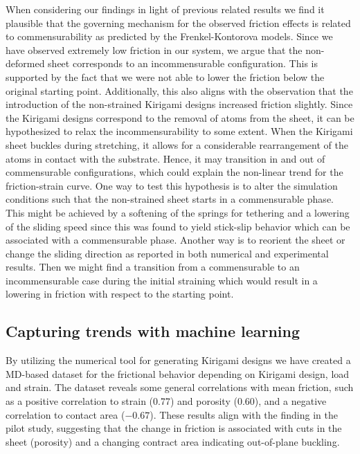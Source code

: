 When considering our findings in light of previous related results we find it
plausible that the governing mechanism for the observed friction effects is
related to commensurability as predicted by the Frenkel-Kontorova models. Since we have observed extremely low friction in
our system, we argue that the non-deformed sheet corresponds to an
incommensurable configuration. This is supported by the fact that we were not
able to lower the friction below the original starting point. Additionally, this
also aligns with the observation that the introduction of the non-strained
Kirigami designs increased friction slightly. Since the Kirigami designs correspond to the removal of atoms from the sheet, it can be hypothesized to relax the incommensurability to some extent. When the Kirigami sheet buckles during stretching, it allows for a
considerable rearrangement of the atoms in contact with the substrate. Hence, it
may transition in and out of commensurable configurations, which could explain
the non-linear trend for the friction-strain curve. One way to test this hypothesis is to alter the simulation conditions such that the non-strained sheet starts in a commensurable phase. This might be achieved by a softening of the springs for tethering and a lowering of the sliding speed since this was found to yield stick-slip behavior which can be associated with a commensurable phase.  Another way is to reorient the sheet or change the sliding direction as reported in both numerical and experimental results. Then we might find a transition from a commensurable to an
incommensurable case during the initial straining which would result in a
lowering in friction with respect to the starting point. 



\subsection{Capturing trends with machine learning}
By utilizing the numerical tool for generating Kirigami designs we have
created a \acrshort{MD}-based dataset for the frictional behavior depending on
Kirigami design, load and strain. The dataset reveals some general correlations
with mean friction, such as a positive correlation to strain (0.77) and porosity
(0.60), and a negative correlation to contact area ($-0.67$). These results
align with the finding in the pilot study, suggesting that the change in
friction is associated with cuts in the sheet (porosity) and a changing contract area indicating out-of-plane buckling. 

